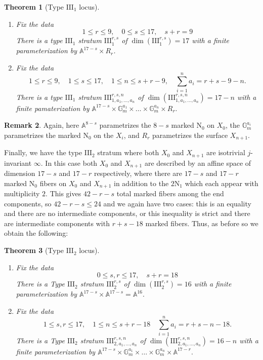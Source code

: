 \documentclass[11pt]{amsart}
\newtheorem{theorem}{Theorem}[section]
\theoremstyle{definition}
\newtheorem{remark}[theorem]{Remark}
\theoremstyle{remark}
\newcommand{\mb}[1]{\mathbb{#1}}
\begin{document}
	\begin{theorem}[Type $\mathrm{III}_{1}$ locus]\label{thm:type32}\leavevmode
		\begin{enumerate}
			\item Fix the data
			$$  1 \le r\le 9, \quad
			0 \le s \le 17, \quad 
			s + r = 9
			$$
			There is a type $\mathrm{III}_1$ stratum $\mathrm{III}^{r,s}_{1}$ of $\dim(\mathrm{III}^{r,s}_{1}) = 17$ with a finite parameterization by $\mb{A}^{17 - s} \times R_r$. 
			\item Fix the data
			$$  1 \le r\le 9, \quad
			1 \le s \le 17, \quad
			1 \le n \le s + r - 9, \quad
			\sum_{i = 1}^n a_i = r + s - 9 - n.$$
			There is a type $\mathrm{III}_1$ stratum
			$
			\mathrm{III}^{r,s,n}_{1, a_1, \ldots, a_n}
			$
			of $\dim(\mathrm{III}^{r,s,n}_{1, a_1, \ldots, a_n}) = 17 - n$ with a finite pamaterization by 
			$
			\mb{A}^{17 - s} \times \mb{G}_m^{a_1} \times \ldots \times \mb{G}_m^{a_n} \times R_r.
			$
			
		\end{enumerate}
	\end{theorem}
	
	\begin{remark} Again, here $\mb{A}^{8-s}$ parametrizes the $8-s$ marked $\mathrm{N}_0$ on $X_0$, the $\mb{G}_m^{a_i}$ parametrizes the marked $\mathrm{N}_0$ on the $X_i$, and $R_r$ parametrizes the surface $X_{n+1}$. \end{remark}
	Finally, we have the type $\mathrm{III}_2$ stratum where both $X_0$ and $X_{n+1}$ are isotrivial $j$-invariant $\infty$. In this case both $X_0$ and $X_{n+1}$ are described by an affine space of dimension $17 - s$ and $17 - r$ respectively, where there are $17-s$ and $17-r$ marked $\mathrm{N}_0$ fibers on $X_0$ and $X_{n + 1}$ in addition to the $2\mathrm{N}_1$ which each appear with multiplicity $2$. This gives $42 - r - s$ total marked fibers among the end components, so $42 - r - s \le 24$ and we again have two cases: this is an equality and there are no intermediate components, or this inequality is strict and there are intermediate components with $r + s - 18$ marked fibers. Thus, as before so we obtain the following:
	
	\begin{theorem}[Type $\mathrm{III}_2$ locus]\label{thm:type33}\leavevmode
		\begin{enumerate} 
			\item Fix the data
			$$  0 \le s,r \le 17, \quad
			s + r = 18
			$$
			There is a Type $\mathrm{III}_2$ stratum $\mathrm{III}_{2}^{r,s}$ of  $\dim(\mathrm{III}_2^{r,s}) = 16$ with a finite parameterization by $\mb{A}^{17-s} \times \mb{A}^{17 - s} = \mb{A}^{16}.$
			\item Fix the data
			$$
			1 \le s,r \le 17, \quad
			1 \le n \le s+r-18 \quad
			\sum_{i = 1}^n a_i = r + s - n - 18.
			$$
			There is a Type $\mathrm{III}_2$ stratum 
			$\mathrm{III}^{r,s,n}_{2, a_1, \ldots, a_n}
			$
			of $\dim(\mathrm{III}^{r,s,n}_{2, a_1, \ldots, a_n}) = 16 - n$ with a finite parameterization by
			$
			\mb{A}^{17 - s} \times \mb{G}_m^{a_1} \times \ldots \times \mb{G}_m^{a_n} \times \mb{A}^{17 - r}.
			$
		\end{enumerate}
	\end{theorem}
	
\end{document}
